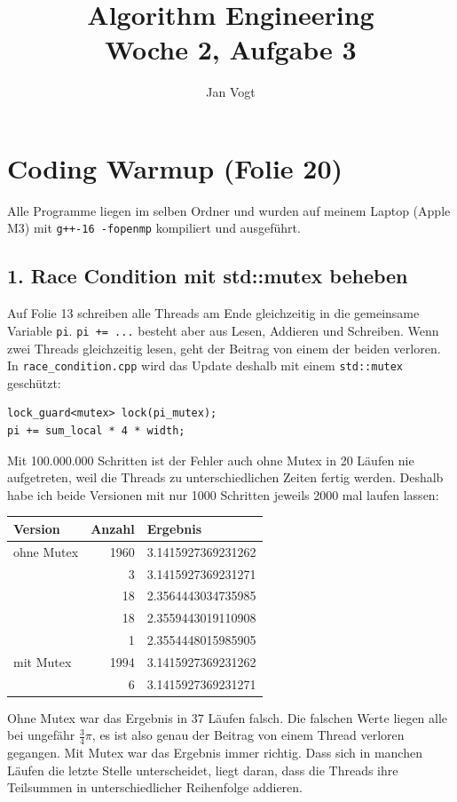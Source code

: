 \documentclass[11pt]{article}
\title{Algorithm Engineering\\Woche 2, Aufgabe 3}
\author{Jan Vogt}
\date{}
\begin{document}
\maketitle

\section*{Coding Warmup (Folie 20)}

Alle Programme liegen im selben Ordner und wurden auf meinem Laptop (Apple M3) mit
\texttt{g++-16 -fopenmp} kompiliert und ausgeführt.

\subsection*{1. Race Condition mit std::mutex beheben}

Auf Folie 13 schreiben alle Threads am Ende gleichzeitig in die gemeinsame Variable \texttt{pi}.
\texttt{pi += ...} besteht aber aus Lesen, Addieren und Schreiben. Wenn zwei Threads gleichzeitig
lesen, geht der Beitrag von einem der beiden verloren. In \texttt{race\_condition.cpp} wird das
Update deshalb mit einem \texttt{std::mutex} geschützt:
\begin{verbatim}
lock_guard<mutex> lock(pi_mutex);
pi += sum_local * 4 * width;
\end{verbatim}
Mit 100.000.000 Schritten ist der Fehler auch ohne Mutex in 20 Läufen nie aufgetreten, weil die
Threads zu unterschiedlichen Zeiten fertig werden. Deshalb habe ich beide Versionen mit nur 1000
Schritten jeweils 2000 mal laufen lassen:

\begin{center}
\begin{tabular}{lrl}
Version & Anzahl & Ergebnis \\
\hline
ohne Mutex & 1960 & 3.1415927369231262 \\
 & 3 & 3.1415927369231271 \\
 & 18 & 2.3564443034735985 \\
 & 18 & 2.3559443019110908 \\
 & 1 & 2.3554448015985905 \\
\hline
mit Mutex & 1994 & 3.1415927369231262 \\
 & 6 & 3.1415927369231271 \\
\end{tabular}
\end{center}

Ohne Mutex war das Ergebnis in 37 Läufen falsch. Die falschen Werte liegen alle bei ungefähr
$\frac{3}{4}\pi$, es ist also genau der Beitrag von einem Thread verloren gegangen. Mit Mutex war
das Ergebnis immer richtig. Dass sich in manchen Läufen die letzte Stelle unterscheidet, liegt daran,
dass die Threads ihre Teilsummen in unterschiedlicher Reihenfolge addieren.
\end{document}
